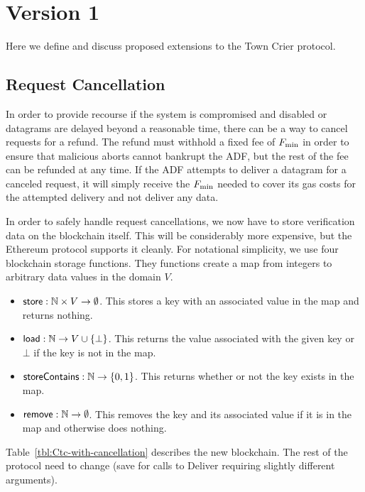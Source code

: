 \pagebreak
\appendix 


\section{Version 1}

Here we define and discuss proposed extensions to the Town Crier protocol.

\subsection{Request Cancellation}

In order to provide recourse if the system is compromised and disabled or datagrams are delayed beyond a reasonable time,
there can be a way to cancel requests for a refund.
The refund must withhold a fixed fee of $F_{\rm min}$ in order to ensure that malicious aborts cannot bankrupt the ADF, but the rest of the fee can be refunded at any time.
If the ADF attempts to deliver a datagram for a canceled request, it will simply receive the $F_{\rm min}$ needed to cover its gas costs for the attempted delivery and not deliver any data.

In order to safely handle request cancellations, we now have to store verification data on the blockchain itself.
This will be considerably more expensive, but the Ethereum protocol supports it cleanly.
For notational simplicity, we use four blockchain storage functions.
They functions create a map from integers to arbitrary data values in the domain $V$.
\begin{itemize}
  \item {${\sf store} : \mathbb{N} \times V \to \emptyset$.}
    This stores a key with an associated value in the map and returns nothing.

  \item {${\sf load} : \mathbb{N} \to V \cup \{\bot\}$.}
    This returns the value associated with the given key or $\bot$ if the key is not in the map.

  \item {${\sf storeContains} : \mathbb{N} \to \{0, 1\}$.}
    This returns whether or not the key exists in the map.

  \item {${\sf remove} : \mathbb{N} \to \emptyset$.}
    This removes the key and its associated value if it is in the map and otherwise does nothing.
\end{itemize}
Table~\ref{tbl:Ctc-with-cancellation} describes the new \tcont blockchain.
The rest of the protocol need to change (save for calls to Deliver requiring slightly different arguments).

